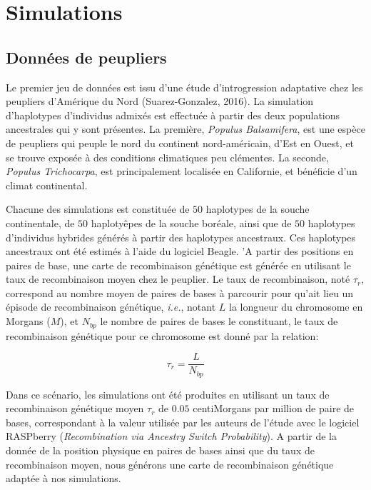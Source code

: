 \documentclass[12pt,twoside]{reedthesis}
\theoremstyle{definition}
\theoremstyle{definition}
\theoremstyle{remark}
\begin{document}
  \section{Simulations}\label{simulations}
  
  \subsection{Données de peupliers}\label{donnees-de-peupliers}
  
  Le premier jeu de données est issu d'une étude d'introgression
  adaptative chez les peupliers d'Amérique du Nord (Suarez-Gonzalez,
  2016). La simulation d'haplotypes d'individus admixés est effectuée à
  partir des deux populations ancestrales qui y sont présentes. La
  première, \emph{Populus Balsamifera}, est une espèce de peupliers qui
  peuple le nord du continent nord-américain, d'Est en Ouest, et se trouve
  exposée à des conditions climatiques peu clémentes. La seconde,
  \emph{Populus Trichocarpa}, est principalement localisée en Californie,
  et bénéficie d'un climat continental.
  
  Chacune des simulations est constituée de \(50\) haplotypes de la souche
  continentale, de \(50\) haplotyêpes de la souche boréale, ainsi que de
  \(50\) haplotypes d'individus hybrides générés à partir des haplotypes
  ancestraux. Ces haplotypes ancestraux ont été estimés à l'aide du
  logiciel Beagle. 'A partir des positions en paires de base, une carte de
  recombinaison génétique est générée en utilisant le taux de
  recombinaison moyen chez le peuplier. Le taux de recombinaison, noté
  \(\tau_r\), correspond au nombre moyen de paires de bases à parcourir
  pour qu'ait lieu un épisode de recombinaison génétique, \emph{i.e.},
  notant \(L\) la longueur du chromosome en Morgans (\(M\)), et \(N_{bp}\)
  le nombre de paires de bases le constituant, le taux de recombinaison
  génétique pour ce chromosome est donné par la relation:
  
  \[\tau_r = \frac{L}{N_{bp}}\]
  
  Dans ce scénario, les simulations ont été produites en utilisant un taux
  de recombinaison génétique moyen \(\tau_r\) de \(0.05\) centiMorgans par
  million de paire de bases, correspondant à la valeur utilisée par les
  auteurs de l'étude avec le logiciel RASPberry
  (\textit{Recombination via Ancestry Switch Probability}). A partir de la
  donnée de la position physique en paires de bases ainsi que du taux de
  recombinaison moyen, nous générons une carte de recombinaison génétique
  adaptée à nos simulations.
  
\end{document}
